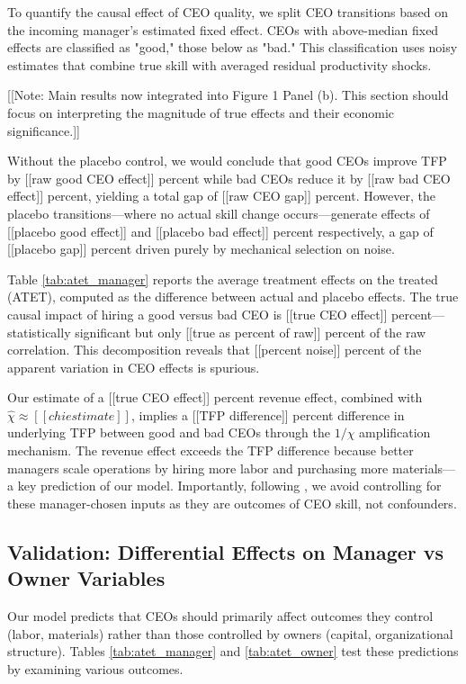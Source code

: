 \documentclass[11pt,a4paper]{article}
\begin{document}
To quantify the causal effect of CEO quality, we split CEO transitions based on the incoming manager's estimated fixed effect. CEOs with above-median fixed effects are classified as "good," those below as "bad." This classification uses noisy estimates that combine true skill with averaged residual productivity shocks.

[[Note: Main results now integrated into Figure 1 Panel (b). This section should focus on interpreting the magnitude of true effects and their economic significance.]]

Without the placebo control, we would conclude that good CEOs improve TFP by [[raw good CEO effect]] percent while bad CEOs reduce it by [[raw bad CEO effect]] percent, yielding a total gap of [[raw CEO gap]] percent. However, the placebo transitions—where no actual skill change occurs—generate effects of [[placebo good effect]] and [[placebo bad effect]] percent respectively, a gap of [[placebo gap]] percent driven purely by mechanical selection on noise.

Table \ref{tab:atet_manager} reports the average treatment effects on the treated (ATET), computed as the difference between actual and placebo effects. The true causal impact of hiring a good versus bad CEO is [[true CEO effect]] percent—statistically significant but only [[true as percent of raw]] percent of the raw correlation. This decomposition reveals that [[percent noise]] percent of the apparent variation in CEO effects is spurious.

Our estimate of a [[true CEO effect]] percent revenue effect, combined with $\hat{\chi} \approx [[chi estimate]]$, implies a [[TFP difference]] percent difference in underlying TFP between good and bad CEOs through the $1/\chi$ amplification mechanism. The revenue effect exceeds the TFP difference because better managers scale operations by hiring more labor and purchasing more materials—a key prediction of our model. Importantly, following \citet{Gandhi2020-nu}, we avoid controlling for these manager-chosen inputs as they are outcomes of CEO skill, not confounders.



\subsection{Validation: Differential Effects on Manager vs Owner Variables}

Our model predicts that CEOs should primarily affect outcomes they control (labor, materials) rather than those controlled by owners (capital, organizational structure). Tables \ref{tab:atet_manager} and \ref{tab:atet_owner} test these predictions by examining various outcomes.
\end{document}
